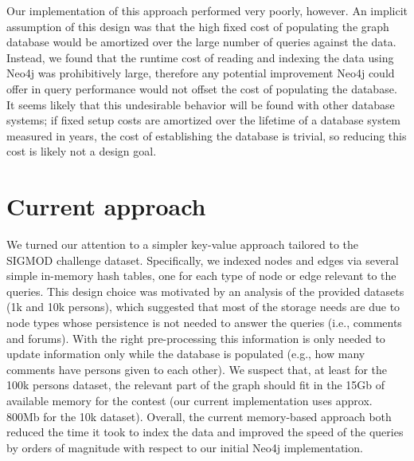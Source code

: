 \documentclass{article}
\begin{document}
Our implementation of this approach performed very poorly, however.
An implicit assumption of this design was that the high fixed cost of
populating the graph database would be amortized over the large number
of queries against the data.  Instead, we found that the runtime cost 
of reading and indexing the data using Neo4j was prohibitively large,
therefore any potential improvement Neo4j could offer in query performance
would not offset the cost of populating the database.
It seems likely that this undesirable behavior will be found
with other database systems; if fixed setup costs are amortized over
the lifetime of a database system measured in years, the cost of
establishing the database is trivial, so reducing this cost is likely
not a design goal.

\section{Current approach}
We turned our attention to a simpler key-value approach tailored 
to the SIGMOD challenge dataset. 
Specifically, we indexed nodes and edges via several simple 
in-memory hash tables, one for each type of node or edge 
relevant to the queries. 
This design choice was motivated by an analysis of the provided 
datasets (1k and 10k persons), which suggested that most of the
storage needs are due to node types whose persistence is not needed to 
answer the queries (i.e., comments and forums). With the right 
pre-processing this information is only needed to update information 
only while the database is populated
(e.g., how many comments have persons given to each other).
We suspect that, at least for the 100k persons dataset, the 
relevant part of the graph should fit in the 15Gb of available memory
for the contest (our current implementation uses approx. 800Mb for 
the 10k dataset). Overall, the current memory-based approach 
both reduced the time it took to index the data and improved the speed 
of the queries by orders of magnitude with respect to our initial
Neo4j implementation.
\end{document}
